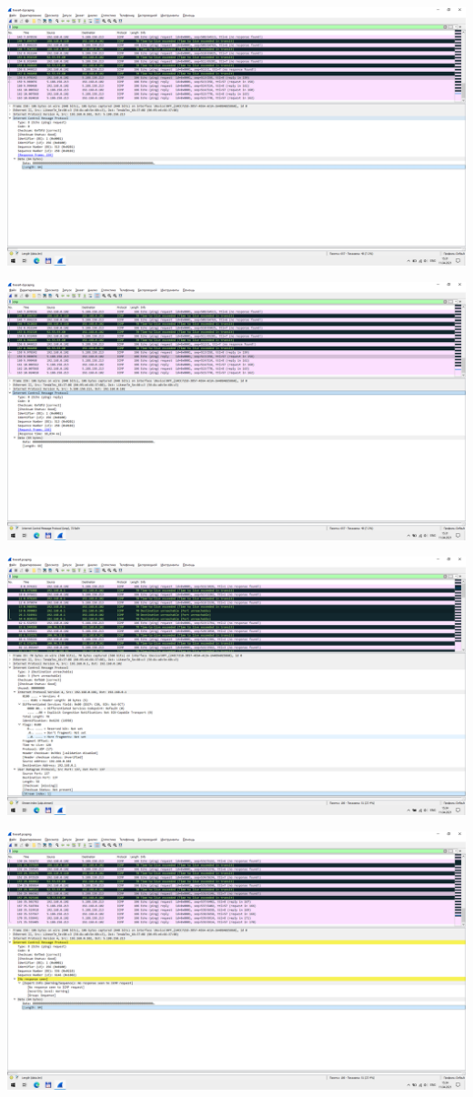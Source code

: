 \begin{center}
    \includegraphics[width=\textwidth]{screenshots/tracert-d_success_request_1}

    \includegraphics[width=\textwidth]{screenshots/tracert-d_success_response_1}

    \includegraphics[width=\textwidth]{screenshots/tracert_port_1}

    \includegraphics[width=\textwidth]{screenshots/tracert_ttl_request_1}


\end{center}
